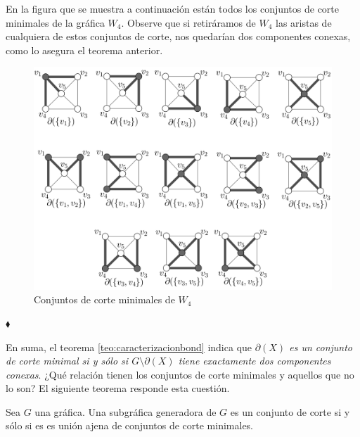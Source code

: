 \begin{ejem}
En la figura que se muestra a continuación están todos los conjuntos de corte minimales de la gráfica $W_{4}$. Observe que si retiráramos de $W_{4}$ las aristas de cualquiera de estos conjuntos de corte, nos quedarían dos componentes conexas, como lo asegura el teorema anterior.

\begin{figure}[H]
    \centering
    \includegraphics[width=1\textwidth]{img/imgchapter2/bond.jpg}
    \caption{Conjuntos de corte minimales de $W_{4}$}
    \label{fig:bondw4}
\end{figure}

\hfill $\blacklozenge$
\end{ejem}

En suma, el teorema \ref{teo:caracterizacionbond} indica que \textit{$\partial(X)$ es un conjunto de corte minimal si y sólo si $G\setminus \partial(X)$ tiene exactamente dos componentes conexas}. ¿Qué relación tienen los conjuntos de corte minimales y aquellos que no lo son? El siguiente teorema responde esta cuestión. 

\begin{teo}\label{teo:unionajenademinimales}
Sea $G$ una gráfica. Una subgráfica generadora de $G$ es un conjunto de corte si y sólo si es es unión ajena de conjuntos de corte minimales.
\end{teo}

